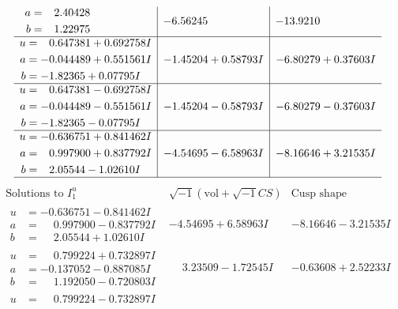 \documentclass[1p]{elsarticle_modified}
\theoremstyle{definition}
\newcommand{\I}{\sqrt{-1}}
\begin{document}
$$\begin{array}{c|c|c}
\begin{aligned}
a &= \phantom{-}2.40428\phantom{ +0.000000I} \\
b &= \phantom{-}1.22975\phantom{ +0.000000I}\end{aligned}
 & -6.56245\phantom{ +0.000000I} & -13.9210\phantom{ +0.000000I} \\ \hline\begin{aligned}
u &= \phantom{-}0.647381 + 0.692758 I \\
a &= -0.044489 + 0.551561 I \\
b &= -1.82365 + 0.07795 I\end{aligned}
 & -1.45204 + 0.58793 I & -6.80279 + 0.37603 I \\ \hline\begin{aligned}
u &= \phantom{-}0.647381 - 0.692758 I \\
a &= -0.044489 - 0.551561 I \\
b &= -1.82365 - 0.07795 I\end{aligned}
 & -1.45204 - 0.58793 I & -6.80279 - 0.37603 I \\ \hline\begin{aligned}
u &= -0.636751 + 0.841462 I \\
a &= \phantom{-}0.997900 + 0.837792 I \\
b &= \phantom{-}2.05544 - 1.02610 I\end{aligned}
 & -4.54695 - 6.58963 I & -8.16646 + 3.21535 I\\
 \hline 
 \end{array}$$\newpage$$\begin{array}{c|c|c}  
\text{Solutions to }I^u_{1}& \I (\text{vol} + \sqrt{-1}CS) & \text{Cusp shape}\\
 \hline 
\begin{aligned}
u &= -0.636751 - 0.841462 I \\
a &= \phantom{-}0.997900 - 0.837792 I \\
b &= \phantom{-}2.05544 + 1.02610 I\end{aligned}
 & -4.54695 + 6.58963 I & -8.16646 - 3.21535 I \\ \hline\begin{aligned}
u &= \phantom{-}0.799224 + 0.732897 I \\
a &= -0.137052 - 0.887085 I \\
b &= \phantom{-}1.192050 - 0.720803 I\end{aligned}
 & \phantom{-}3.23509 - 1.72545 I & -0.63608 + 2.52233 I \\ \hline\begin{aligned}
u &= \phantom{-}0.799224 - 0.732897 I \\

\end{aligned}
\end{array}$$
\end{document}

